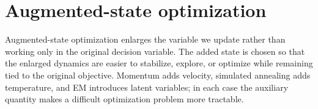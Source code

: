 \section{Augmented-state optimization}
\label{sec:augmented-state-optimization}

Augmented-state optimization enlarges the variable we update rather than working only in the original decision variable.
The added state is chosen so that the enlarged dynamics are easier to stabilize, explore, or optimize while remaining tied to the original objective.
Momentum adds velocity, simulated annealing adds temperature, and EM introduces latent variables; in each case the auxiliary quantity makes a difficult optimization problem more tractable.




